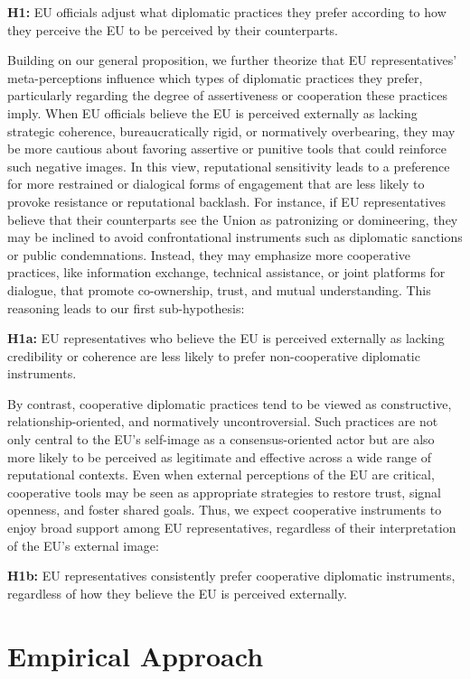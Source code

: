\documentclass[
  letterpaper,
  DIV=11,
  numbers=noendperiod]{scrartcl}
\begin{document}
\textbf{H1:} EU officials adjust what diplomatic practices they prefer
according to how they perceive the EU to be perceived by their
counterparts.

Building on our general proposition, we further theorize that EU
representatives' meta-perceptions influence which types of diplomatic
practices they prefer, particularly regarding the degree of
assertiveness or cooperation these practices imply. When EU officials
believe the EU is perceived externally as lacking strategic coherence,
bureaucratically rigid, or normatively overbearing, they may be more
cautious about favoring assertive or punitive tools that could reinforce
such negative images. In this view, reputational sensitivity leads to a
preference for more restrained or dialogical forms of engagement that
are less likely to provoke resistance or reputational backlash. For
instance, if EU representatives believe that their counterparts see the
Union as patronizing or domineering, they may be inclined to avoid
confrontational instruments such as diplomatic sanctions or public
condemnations. Instead, they may emphasize more cooperative practices,
like information exchange, technical assistance, or joint platforms for
dialogue, that promote co-ownership, trust, and mutual understanding.
This reasoning leads to our first sub-hypothesis:

\textbf{H1a:} EU representatives who believe the EU is perceived
externally as lacking credibility or coherence are less likely to prefer
non-cooperative diplomatic instruments.

By contrast, cooperative diplomatic practices tend to be viewed as
constructive, relationship-oriented, and normatively uncontroversial.
Such practices are not only central to the EU's self-image as a
consensus-oriented actor but are also more likely to be perceived as
legitimate and effective across a wide range of reputational contexts.
Even when external perceptions of the EU are critical, cooperative tools
may be seen as appropriate strategies to restore trust, signal openness,
and foster shared goals. Thus, we expect cooperative instruments to
enjoy broad support among EU representatives, regardless of their
interpretation of the EU's external image:

\textbf{H1b:} EU representatives consistently prefer cooperative
diplomatic instruments, regardless of how they believe the EU is
perceived externally.

\section{Empirical Approach}\label{empirical-approach}
\end{document}

